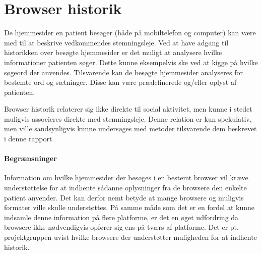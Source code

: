 \section{Browser historik}
De hjemmesider en patient besøger (både på mobiltelefon og computer) kan være med til at beskrive vedkommendes stemningsleje.
Ved at have adgang til historikken over besøgte hjemmesider er det muligt at analysere hvilke informationer patienten søger.
Dette kunne eksempelvis ske ved at kigge på hvilke søgeord der anvendes.
Tilsvarende kan de besøgte hjemmesider analyseres for bestemte ord og sætninger.
Disse kan være prædefinerede og/eller oplyst af patienten.

Browser historik relaterer sig ikke direkte til social aktivitet, men kunne i stedet muligvis associeres direkte med stemningsleje.
Denne relation er kun spekulativ, men ville sandsynligvis kunne undersøges med metoder tilsvarende dem beskrevet i denne rapport.

\paragraph{Begrænsninger}
Information om hvilke hjemmesider der besøges i en bestemt browser vil kræve understøttelse for at indhente sådanne oplysninger fra de browsere den enkelte patient anvender.
Det kan derfor nemt betyde at mange browsere og muligvis formater ville skulle understøttes.
På samme måde som det er en fordel at kunne indsamle denne information på flere platforme, er det en øget udfordring da browsere ikke nødvendigvis opfører sig ens på tværs af platforme.
Det er pt. projektgruppen uvist hvilke browsere der understøtter muligheden for at indhente historik.